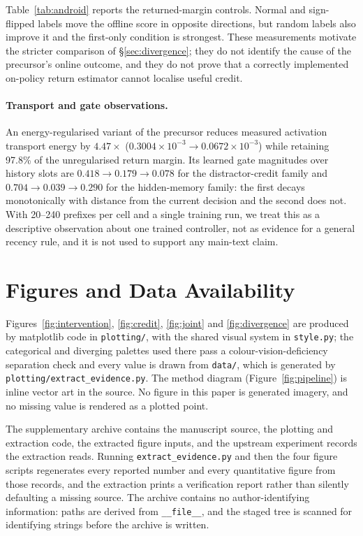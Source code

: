 \documentclass{article}
\begin{document}
Table~\ref{tab:android} reports the returned-margin controls.
Normal and sign-flipped labels move the offline score in opposite directions, but
random labels also improve it and the first-only condition is strongest. These
measurements motivate the stricter comparison of \S\ref{sec:divergence}; they do
not identify the cause of the precursor's online outcome, and they do not prove
that a correctly implemented on-policy return estimator cannot localise useful
credit.

\paragraph{Transport and gate observations.} An energy-regularised variant of
the precursor reduces measured activation transport energy by $4.47\times$
($0.3004\times10^{-3}\to0.0672\times10^{-3}$) while retaining 97.8\% of the
unregularised return margin. Its learned gate magnitudes over history slots are
$0.418\to0.179\to0.078$ for the distractor-credit family and
$0.704\to0.039\to0.290$ for the hidden-memory family: the first decays
monotonically with distance from the current decision and the second does not.
With 20--240 prefixes per cell and a single training run, we treat this as a
descriptive observation about one trained controller, not as evidence for a
general recency rule, and it is not used to support any main-text claim.

\section{Figures and Data Availability}
\label{app:completion}
Figures~\ref{fig:intervention}, \ref{fig:credit}, \ref{fig:joint} and
\ref{fig:divergence} are produced by matplotlib code in \texttt{plotting/}, with
the shared visual system in \texttt{style.py}; the categorical and diverging
palettes used there pass a colour-vision-deficiency separation check and every
value is drawn from \texttt{data/}, which is generated by
\texttt{plotting/extract\_evidence.py}. The method diagram
(Figure~\ref{fig:pipeline}) is inline vector art in the source. No figure in this
paper is generated imagery, and no missing value is rendered as a plotted point.

The supplementary archive contains the manuscript source, the plotting and
extraction code, the extracted figure inputs, and the upstream experiment
records the extraction reads. Running \texttt{extract\_evidence.py} and then the
four figure scripts regenerates every reported number and every quantitative
figure from those records, and the extraction prints a verification report rather
than silently defaulting a missing source. The archive contains no
author-identifying information: paths are derived from \texttt{\_\_file\_\_}, and
the staged tree is scanned for identifying strings before the archive is written.
\end{document}
